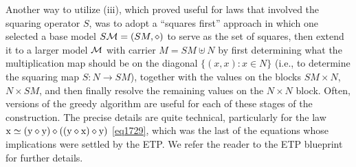Another way to utilize (iii), which proved useful for laws that involved the squaring operator $S$, was to adopt a ``squares first'' approach in which one selected a base model $S{\mathcal{M}} = (SM,\diamond)$ to serve as the set of squares, then extend it to a larger model ${\mathcal{M}}$ with carrier $M = SM \uplus N$ by first determining what the multiplication map should be on the diagonal $\{ (x,x): x\in N\}$ (i.e., to determine the squaring map $S \colon N \to SM$), together with the values on the blocks $SM \times N$, $N \times SM$, and then finally resolve the remaining values on the $N \times N$ block.  Often, versions of the greedy algorithm are useful for each of these stages of the construction.  The precise details are quite technical, particularly for the law $\mathrm{x} \simeq (\mathrm{y} \diamond \mathrm{y}) \diamond ((\mathrm{y} \diamond \mathrm{x}) \diamond \mathrm{y})$ \eqref{eq1729}, which was the last of the equations whose implications were settled by the ETP.  We refer the reader to the ETP blueprint for further details.

